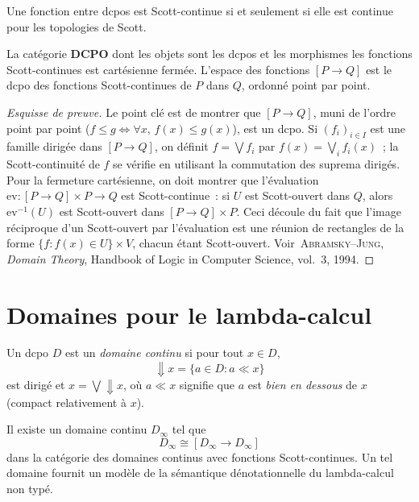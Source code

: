 \begin{proposition}
Une fonction entre dcpos est Scott-continue si et seulement si elle est continue pour les
topologies de Scott.
\end{proposition}

\begin{theoreme}
La cat\'egorie $\mathbf{DCPO}$ dont les objets sont les dcpos et les morphismes les
fonctions Scott-continues est cart\'esienne ferm\'ee. L'espace des fonctions
$[P \to Q]$ est le dcpo des fonctions Scott-continues de $P$ dans $Q$, ordonn\'e
point par point.
\end{theoreme}

\begin{proof}[Esquisse de preuve]
Le point cl\'e est de montrer que $[P \to Q]$, muni de l'ordre point par point
($f \leq g \iff \forall x,\, f(x) \leq g(x)$), est un dcpo. Si $(f_i)_{i \in I}$
est une famille dirig\'ee dans $[P \to Q]$, on d\'efinit $f = \bigvee f_i$ par
$f(x) = \bigvee_i f_i(x)$~; la Scott-continuit\'e de $f$ se v\'erifie en utilisant
la commutation des suprema dirig\'es. Pour la fermeture cart\'esienne, on doit
montrer que l'\'evaluation $\mathrm{ev} \colon [P \to Q] \times P \to Q$ est
Scott-continue~: si $U$ est Scott-ouvert dans $Q$, alors $\mathrm{ev}^{-1}(U)$ est
Scott-ouvert dans $[P \to Q] \times P$. Ceci d\'ecoule du fait que l'image
r\'eciproque d'un Scott-ouvert par l'\'evaluation est une r\'eunion de rectangles de
la forme $\{f : f(x) \in U\} \times V$, chacun \'etant Scott-ouvert.
Voir~\textsc{Abramsky--Jung},
\emph{Domain Theory}, Handbook of Logic in Computer Science, vol.~3, 1994.
\end{proof}

\section{Domaines pour le lambda-calcul}

\begin{definition}
Un dcpo $D$ est un \emph{domaine continu} si pour tout $x \in D$,
\[
  {\Downarrow} x = \{ a \in D : a \ll x \}
\]
est dirig\'e et $x = \bigvee {\Downarrow} x$, o\`u $a \ll x$ signifie que $a$ est
\emph{bien en dessous} de $x$ (compact relativement \`a $x$).
\end{definition}

\begin{theoreme}
\label{thm:scott-model}
Il existe un domaine continu $D_\infty$ tel que
\[
  D_\infty \cong [D_\infty \to D_\infty]
\]
dans la cat\'egorie des domaines continus avec fonctions Scott-continues. Un tel domaine
fournit un mod\`ele de la s\'emantique d\'enotationnelle du lambda-calcul non typ\'e.
\end{theoreme}

